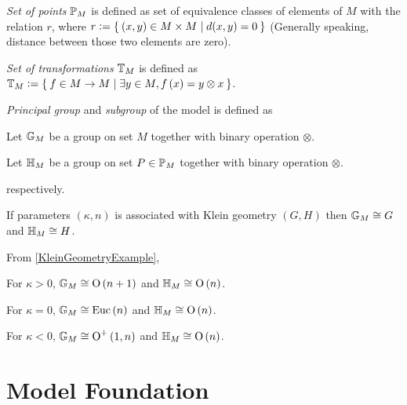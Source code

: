 \documentclass[stu, babel, american, biblatex, a4paper, draftall]{apa7}
\begin{document}
\begin{definition}\label{SetOfPoints}
    \textit{Set of points} $\mathbb{P}_{M}$ is defined as set of equivalence classes of elements of $M$ with the relation $r$,
    where $r\vcentcolon=\Set{\left(x,y\right)\in M\times M | d(x,y)=0}$
    (Generally speaking, distance between those two elements are zero).
\end{definition}
\begin{definition}\label{SetOfTransformations}
    \textit{Set of transformations} $\mathbb{T}_{M}$ is defined as
    $\mathbb{T}_{M}\vcentcolon=\Set{f\in M \to M | \exists y \in M, f\left(x\right) = y \otimes x}$.
\end{definition}
\begin{definition}\label{ModelGroup}
    \textit{Principal group} and \textit{subgroup} of the model is defined as
    \begin{APAitemize}
        \item Let $\mathbb{G}_{M}$ be a group on set $M$ together with binary operation $\otimes$.
        \item Let $\mathbb{H}_{M}$ be a group on set $P\in\mathbb{P}_{M}$ together with binary operation $\otimes$.
    \end{APAitemize}
    respectively.
\end{definition}
\begin{conjecture}\label{GeometricGroupStructure}
    If parameters $\left(\kappa,n\right)$ is associated with Klein geometry $\left(G,H\right)$
    then $\mathbb{G}_{M}\cong G$ and $\mathbb{H}_{M}\cong H$.

    From \cref{KleinGeometryExample},
    \begin{APAitemize}
        \item For $\kappa>0$, $\mathbb{G}_{M}\cong\operatorname{O}\left(n+1\right)$ and $\mathbb{H}_{M}\cong\operatorname{O}\left(n\right)$.
        \item For $\kappa=0$, $\mathbb{G}_{M}\cong\operatorname{Euc}\left(n\right)$ and $\mathbb{H}_{M}\cong\operatorname{O}\left(n\right)$.
        \item For $\kappa<0$, $\mathbb{G}_{M}\cong\operatorname{O}^{+}\left(1,n\right)$ and $\mathbb{H}_{M}\cong\operatorname{O}\left(n\right)$.
    \end{APAitemize}
\end{conjecture}
\section{Model Foundation}
\end{document}
